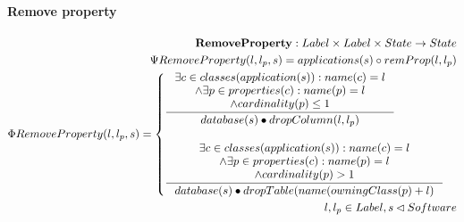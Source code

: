 \documentclass[11pt]{article}
\begin{document}
\paragraph{Remove property}
\begin{align*}
	\mathbf{RemoveProperty} : Label \times Label \times State \rightarrow State \\
	\Psi RemoveProperty(l, l_p, s) =  applications(s) \circ  remProp(l, l_p) \\
	\Phi RemoveProperty(l, l_p, s) = \begin{cases}
		 \inference{\exists c \in classes(application(s)) : name(c) = l\\ 
		\wedge \exists p \in properties(c) : name(p) = l \\ \wedge cardinality(p) \leq 1}{database(s) \bullet dropColumn(l, l_p)}  \\\\
		 \inference{\exists c \in classes(application(s)) : name(c) = l\\ 
		\wedge \exists p \in properties(c)  : name(p) = l \\ \wedge cardinality(p)>1}{database(s) \bullet dropTable(name(owningClass(p)+l)}
 	\end{cases}\\
 	l, l_p \in Label, s \lhd Software
\end{align*}
\end{document}
